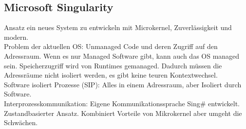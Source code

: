 \documentclass[a4paper]{article}
\begin{document}
\subsection{Microsoft Singularity}
Ansatz ein neues System zu entwickeln mit Microkernel, Zuverlässigkeit und modern.\\
Problem der aktuellen OS: Unmanaged Code und deren Zugriff auf den Adressraum. Wenn es nur Managed Software gibt, kann auch das OS managed sein. Speicherzugriff wird von Runtimes gemanaged. Dadurch müssen die Adressräume nicht isoliert werden, es gibt keine teuren Kontextwechsel.\\
Software isoliert Prozesse (SIP): Alles in einem Adressraum, aber Isoliert durch Software.\\
Interprozesskommunikation: Eigene Kommunikationssprache Sing\# entwickelt. Zustandbasierter Ansatz.
Kombiniert Vorteile von Mikrokernel aber umgeht die Schwächen.\\
\end{document}
